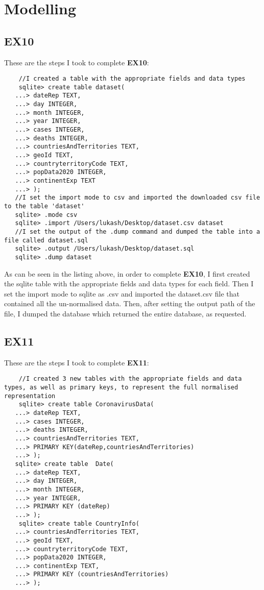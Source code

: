 \documentclass[10pt]{article}
\begin{document}
\newpage
\section{Modelling}
\subsection{EX10}
These are the steps I took to complete \textbf{EX10}:
\begin{listing}[H]
    \begin{verbatim}
    //I created a table with the appropriate fields and data types
    sqlite> create table dataset(
   ...> dateRep TEXT,
   ...> day INTEGER,
   ...> month INTEGER,
   ...> year INTEGER,
   ...> cases INTEGER,
   ...> deaths INTEGER,
   ...> countriesAndTerritories TEXT,
   ...> geoId TEXT,
   ...> countryterritoryCode TEXT,
   ...> popData2020 INTEGER,
   ...> continentExp TEXT
   ...> );
   //I set the import mode to csv and imported the downloaded csv file to the table 'dataset'
   sqlite> .mode csv
   sqlite> .import /Users/lukash/Desktop/dataset.csv dataset
   //I set the output of the .dump command and dumped the table into a file called dataset.sql
   sqlite> .output /Users/lukash/Desktop/dataset.sql
   sqlite> .dump dataset
    \end{verbatim}
\end{listing}

As can be seen in the listing above, in order to complete \textbf{EX10}, I first created the sqlite table with the appropriate fields and data types for each field. Then I set the import mode to sqlite as .csv and imported the dataset.csv file that contained all the un-normalised data. Then, after setting the output path of the file, I dumped the database which returned the entire database, as requested.

\newpage
\subsection{EX11}
These are the steps I took to complete \textbf{EX11}:
\begin{listing}[H]
    \begin{verbatim}
    //I created 3 new tables with the appropriate fields and data types, as well as primary keys, to represent the full normalised representation 
    sqlite> create table CoronavirusData(
   ...> dateRep TEXT,
   ...> cases INTEGER,
   ...> deaths INTEGER,
   ...> countriesAndTerritories TEXT,
   ...> PRIMARY KEY(dateRep,countriesAndTerritories)
   ...> );
   sqlite> create table  Date(
   ...> dateRep TEXT,
   ...> day INTEGER,
   ...> month INTEGER,
   ...> year INTEGER,
   ...> PRIMARY KEY (dateRep)
   ...> );
    sqlite> create table CountryInfo(
   ...> countriesAndTerritories TEXT,
   ...> geoId TEXT,
   ...> countryterritoryCode TEXT,
   ...> popData2020 INTEGER,
   ...> continentExp TEXT,
   ...> PRIMARY KEY (countriesAndTerritories)
   ...> );
    \end{verbatim}
\end{listing}
\end{document}
